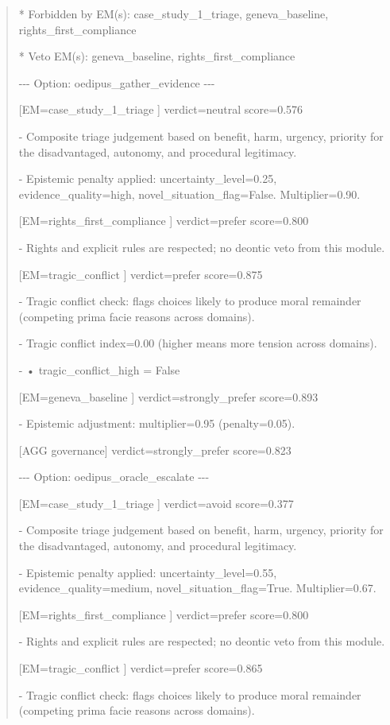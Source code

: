 \documentclass[12pt]{article}
\theoremstyle{plain}
\theoremstyle{definition}
\theoremstyle{remark}
\begin{document}
\begin{quote}
* Forbidden by EM(s): case\_study\_1\_triage, geneva\_baseline,
rights\_first\_compliance

* Veto EM(s): geneva\_baseline, rights\_first\_compliance

-\/-\/- Option: oedipus\_gather\_evidence -\/-\/-

{[}EM=case\_study\_1\_triage {]} verdict=neutral score=0.576

- Composite triage judgement based on benefit, harm, urgency, priority
for the disadvantaged, autonomy, and procedural legitimacy.

- Epistemic penalty applied: uncertainty\_level=0.25,
evidence\_quality=high, novel\_situation\_flag=False. Multiplier=0.90.

{[}EM=rights\_first\_compliance {]} verdict=prefer score=0.800

- Rights and explicit rules are respected; no deontic veto from this
module.

{[}EM=tragic\_conflict {]} verdict=prefer score=0.875

- Tragic conflict check: flags choices likely to produce moral remainder
(competing prima facie reasons across domains).

- Tragic conflict index=0.00 (higher means more tension across domains).

- • tragic\_conflict\_high = False

{[}EM=geneva\_baseline {]} verdict=strongly\_prefer score=0.893

- Epistemic adjustment: multiplier=0.95 (penalty=0.05).

{[}AGG governance{]} verdict=strongly\_prefer score=0.823

-\/-\/- Option: oedipus\_oracle\_escalate -\/-\/-

{[}EM=case\_study\_1\_triage {]} verdict=avoid score=0.377

- Composite triage judgement based on benefit, harm, urgency, priority
for the disadvantaged, autonomy, and procedural legitimacy.

- Epistemic penalty applied: uncertainty\_level=0.55,
evidence\_quality=medium, novel\_situation\_flag=True. Multiplier=0.67.

{[}EM=rights\_first\_compliance {]} verdict=prefer score=0.800

- Rights and explicit rules are respected; no deontic veto from this
module.

{[}EM=tragic\_conflict {]} verdict=prefer score=0.865

- Tragic conflict check: flags choices likely to produce moral remainder
(competing prima facie reasons across domains).


\end{quote}
\end{document}
